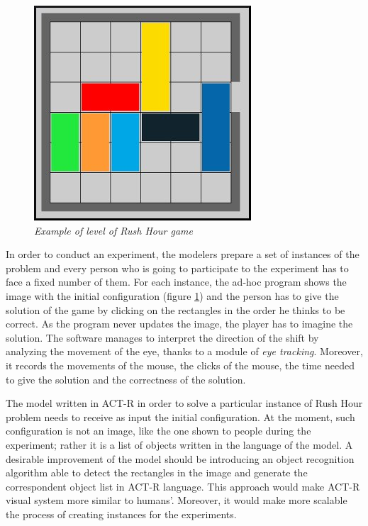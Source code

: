 	\begin{figure}[!h]
	  \begin{center} 
	    \includegraphics[scale=0.6]{images/ch_03/originale.jpg}	
	  \end{center} 
	  \caption{\textit{Example of level of Rush Hour game}}
	  \label{fig:RushHourHuman}	
  	\end{figure}
	
	In order to conduct an experiment, the modelers prepare a set of instances of the problem and every person who is going to participate to the experiment has to face a fixed number of them.
	For each instance, the ad-hoc program shows the image with the initial configuration (figure \ref{fig:RushHourHuman}) and the person has to give the solution of the game by clicking on the rectangles in the order he thinks to be correct. As the program never updates the image, the player has to imagine the solution. The software manages to interpret the direction of the shift by analyzing the movement of the eye, thanks to a module of \emph{eye tracking}. Moreover, it records the movements of the mouse, the clicks of the mouse, the time needed to give the solution and the correctness of the solution. 

	The model written in ACT-R in order to solve a particular instance of Rush Hour problem needs to receive as input the initial configuration. At the moment, such configuration is not an image, like the one shown to people during the experiment; rather it is a list of objects written in the language of the model.
	A desirable improvement of the model should be introducing an object recognition algorithm able to detect the rectangles in the image and generate the correspondent object list in ACT-R language. 
	This approach would make ACT-R visual system more similar to humans'. Moreover, it would make more scalable the process of creating instances for the experiments. 


